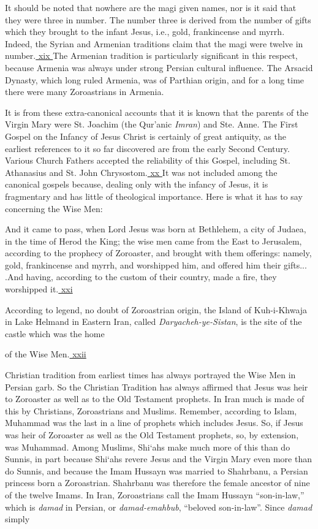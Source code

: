 It should be noted that nowhere are the magi given names, nor is it said that they were three in number. The number three is derived from the number of gifts which they brought to the infant Jesus, i.e., gold, frankincense and myrrh. Indeed, the Syrian and Armenian traditions claim that the magi were twelve in number.\hyperref[_edn19]{ xix } The Armenian tradition is particularly significant in this respect, because Armenia was always under strong Persian cultural influence. The Arsacid Dynasty, which long ruled Armenia, was of Parthian origin, and for a long time there were many Zoroastrians in Armenia.

It is from these extra-canonical accounts that it is known that the parents of the Virgin Mary were St. Joachim (the Qur'anic \emph{Imran}) and Ste. Anne. The First Gospel on the Infancy of Jesus Christ is certainly of great antiquity, as the earliest references to it so far discovered are from the early Second Century. Various Church Fathers accepted the reliability of this Gospel, including St. Athanasius and St. John Chrysostom.\hyperref[_edn20]{ xx } It was not included among the canonical gospels because, dealing only with the infancy of Jesus, it is fragmentary and has little of theological importance. Here is what it has to say concerning the Wise Men:

\begin{quotex}
And it came to pass, when Lord Jesus was born at Bethlehem, a city of Judaea, in the time of Herod the King; the wise men came from the East to Jerusalem, according to the prophecy of Zoroaster, and brought with them offerings: namely, gold, frankincense and myrrh, and worshipped him, and offered him their gifts... .And having, according to the custom of their country, made a fire, they worshipped it.\hyperref[_edn21]{ xxi }
\end{quotex}


According to legend, no doubt of Zoroastrian origin, the Island of Kuh-i-Khwaja in Lake Helmand in Eastern Iran, called
\emph{Daryacheh-ye-Sistan}, is the site of the castle which was the home

of the Wise Men.\hyperref[_edn22]{ xxii }

Christian tradition from earliest times has always portrayed the Wise Men in Persian garb. So the Christian Tradition has always affirmed that Jesus was heir to Zoroaster as well as to the Old Testament prophets. In Iran much is made of this by Christians, Zoroastrians and Muslims. Remember, according to Islam, Muhammad was the last in a line of prophets which includes Jesus. So, if Jesus was heir of Zoroaster as well as the Old Testament prophets, so, by extension, was Muhammad. Among Muslims, Shi`ahs make much more of this than do Sunnis, in part because Shi`ahs revere Jesus and the Virgin Mary even more than do Sunnis, and because the Imam Hussayn was married to Shahrbanu, a Persian princess born a Zoroastrian. Shahrbanu was therefore the female ancestor of nine of the twelve Imams. In Iran, Zoroastrians call the Imam Hussayn ``son-in-law,'' which is \emph{damad} in Persian, or
\emph{damad-emahbub}, ``beloved son-in-law''. Since \emph{damad} simply

